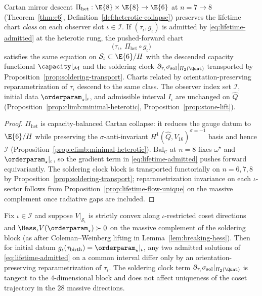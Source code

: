 \begin{proposition}
\label{prop:lifetime-descent}
Cartan mirror descent $\Pi_{\mathrm{het}}:\E{8}\times\E{8}\to\E{6}$ at
$n=7\to8$ (Theorem~\ref{thm:e6}, Definition~\ref{def:heterotic-collapse})
preserves the lifetime chart \emph{class} on each observer slot
$\iota\in\mathcal{I}$. If $(\tau_\iota,g_\iota)$ is admitted by
\eqref{eq:lifetime-admitted} at the heterotic rung, the pushed-forward chart
\begin{equation}\label{eq:lifetime-descent}
  \bigl(\tau_\iota,\ \Pi_{\mathrm{het}}\circ g_\iota\bigr)
\end{equation}
satisfies the same equation on $\mathcal{S}_\iota\subset\E{6}/H$ with the
descended capacity functional $\capacity|_{\mathcal{M}}$ and the soldering clock
$\partial_{\tau_\iota}\sigma_{\mathrm{sol}}|_{H_2(\Quat)}$ transported by
Proposition~\ref{prop:soldering-transport}. Charts related by
orientation-preserving reparametrization of $\tau_\iota$ descend to the same
class. The observer index set $\mathcal{I}$, initial data
$\orderparam_\star|_\iota$, and admissible interval $I_\iota$ are unchanged on
$\hat Q$ (Proposition~\ref{prop:climb:minimal-heterotic},
Proposition~\ref{prop:stone-lift}).
\end{proposition}

\begin{proof}
$\Pi_{\mathrm{het}}$ is capacity-balanced Cartan collapse: it reduces the
gauge datum to $\E{6}/H$ while preserving the $\sigma$-anti-invariant
$H^1(\hat Q,V_{16})^{\sigma=-1}$ basis and hence $\mathcal{I}$
(Proposition~\ref{prop:climb:minimal-heterotic}). $\mathrm{Bal}_{\mathcal{C}}$
at $n=8$ fixes $\omega^\star$ and $\orderparam_\star|_\iota$, so the gradient
term in \eqref{eq:lifetime-admitted} pushes forward equivariantly. The
soldering clock block is transported functorially on $n=6,7,8$ by
Proposition~\ref{prop:soldering-transport}; reparametrization invariance on
each $\iota$-sector follows from Proposition~\ref{prop:lifetime-flow-unique}
on the massive complement once radiative gaps are included.
\end{proof}

\begin{proposition}
\label{prop:lifetime-flow-unique}
Fix $\iota\in\mathcal{I}$ and suppose $V|_{\mathcal{S}_\iota}$ is strictly
convex along $\iota$-restricted coset directions and
$\Hess_\iota V(\orderparam_\star)\succ 0$ on the massive complement of the
soldering block (as after Coleman--Weinberg lifting in
Lemma~\ref{lem:breaking-hess}). Then for initial datum
$g_\iota(\tau_{\mathrm{birth}})=\orderparam_\star|_\iota$, any two admitted
solutions of \eqref{eq:lifetime-admitted} on a common interval differ only
by an orientation-preserving reparametrization of $\tau_\iota$. The soldering
clock term $\partial_{\tau_\iota}\sigma_{\mathrm{sol}}|_{H_2(\Quat)}$ is
tangent to the $4$-dimensional block and does not affect uniqueness of the
coset trajectory in the $28$ massive directions.
\end{proposition}

